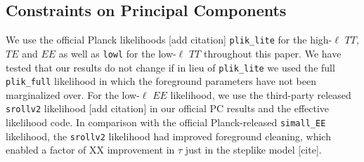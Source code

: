 \documentclass[prd,twocolumn,amsmath,amssymb,floatfix,superscriptaddress,nofootinbib]{revtex4-1}
\begin{document}
\subsection{Constraints on Principal Components}
We use the official Planck likelihoods [add citation] \texttt{plik\_lite} for the high-$\ell$ $TT$, $TE$ and $EE$ as well as \texttt{lowl} for the low-$\ell$ $TT$ throughout this paper. We have tested that our results do not change if in lieu of \texttt{plik\_lite} we used the full \texttt{plik\_full} likelihood in which the foreground parameters have not been marginalized over. For the low-$\ell$ $EE$ likelihood, we use the third-party released \texttt{srollv2} likelihood [add citation] in our official PC results and the effective likelihood code. In comparison with the official Planck-released \texttt{simall\_EE} likelihood, the \texttt{srollv2} likelihood had improved foreground cleaning, which enabled a factor of XX improvement in $\tau$ just in the steplike model [cite].
\end{document}
